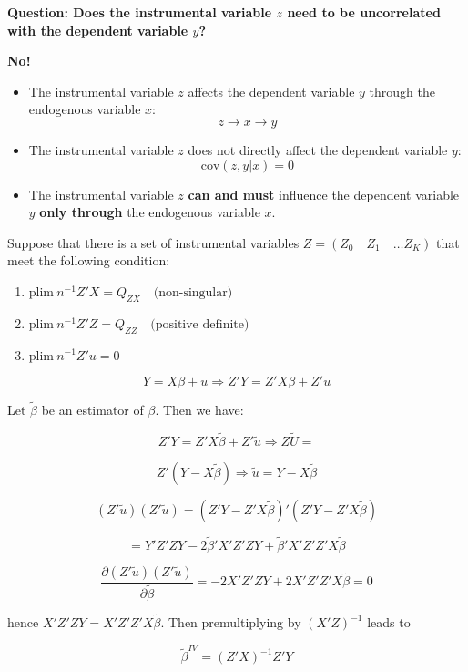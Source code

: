 \documentclass[12pt, oneside]{article}
\begin{document}
\textbf{Question: Does the instrumental variable \( z \) need to be uncorrelated with the dependent variable \( y \)?}

\textbf{No!}

\begin{itemize}
    \item The instrumental variable \( z \) affects the dependent variable \( y \) through the endogenous variable \( x \):
    \[
    z \to x \to y
    \]
    \item The instrumental variable \( z \) does not directly affect the dependent variable \( y \):
    \[
    \text{cov}(z, y | x) = 0
    \]
    \item The instrumental variable \( z \) \textbf{can and must} influence the dependent variable \( y \) \textbf{only through} the endogenous variable \( x \).
\end{itemize}

Suppose that there is a set of instrumental variables \( Z = (Z_0 \quad Z_1 \quad \dots Z_K) \) 
that meet the following condition:

\begin{enumerate}
    \item \( \text{plim} \ n^{-1}Z'X = Q_{ZX} \quad \text{(non-singular)} \)
    \item \( \text{plim} \ n^{-1}Z'Z = Q_{ZZ} \quad \text{(positive definite)} \)
    \item \( \text{plim} \ n^{-1}Z'u = 0 \)
\end{enumerate}

\[
Y = X\beta + u \Rightarrow Z'Y = Z'X\beta + Z'u
\]

Let \( \tilde{\beta} \) be an estimator of \( \beta \). Then we have:

\[
Z'Y = Z'X\tilde{\beta} + Z'\tilde{u} \Rightarrow Z\tilde{U} =
\]

\[
Z'(Y - X\tilde{\beta}) \Rightarrow \tilde{u} = Y - X\tilde{\beta}
\]


\[
(Z'\tilde{u})(Z'\tilde{u}) = (Z'Y - Z'X\tilde{\beta})'(Z'Y - Z'X\tilde{\beta})
\]

\[
= Y'Z'Z Y - 2\tilde{\beta}'X'Z'Z Y + \tilde{\beta}'X'Z'Z'X\tilde{\beta}
\]

\[
\frac{\partial (Z'\tilde{u})(Z'\tilde{u})}{\partial \tilde{\beta}} = -2X'Z'Z Y + 2X'Z'Z'X\tilde{\beta} = 0
\]

hence \( X'Z'Z Y = X'Z'Z'X\tilde{\beta} \). Then premultiplying by \( (X'Z)^{-1} \) leads to

\[
\tilde{\beta}^{IV} = (Z'X)^{-1}Z'Y
\]
\end{document}
